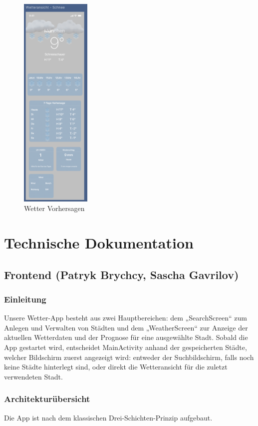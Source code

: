 \documentclass{article}
\begin{document}
\begin{figure}[H]
\includegraphics[width=0.3\textwidth]{wetter_schnee.png}
\caption{Wetter Vorhersagen}
\end{figure}

\section{Technische Dokumentation}
\subsection{Frontend \small{(Patryk Brychcy, Sascha Gavrilov)}}
\subsubsection{Einleitung}
Unsere Wetter-App besteht aus zwei Hauptbereichen: dem „SearchScreen“ zum Anlegen und Verwalten von Städten und dem „WeatherScreen“ zur Anzeige der aktuellen Wetterdaten und der Prognose für eine ausgewählte Stadt. Sobald die App gestartet wird, entscheidet MainActivity anhand der gespeicherten Städte, welcher Bildschirm zuerst angezeigt wird: entweder der Suchbildschirm, falls noch keine Städte hinterlegt sind, oder direkt die Wetteransicht für die zuletzt verwendeten Stadt.

\subsubsection{Architekturübersicht}
Die App ist nach dem klassischen Drei-Schichten-Prinzip aufgebaut.
\end{document}
